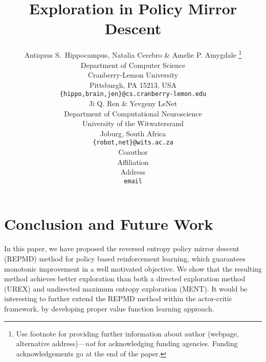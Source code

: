 \documentclass{article} %
\title{Exploration in Policy Mirror Descent}
\author{Antiquus S.~Hippocampus, Natalia Cerebro \& Amelie P. Amygdale \thanks{ Use footnote for providing further information
about author (webpage, alternative address)---\emph{not} for acknowledging
funding agencies.  Funding acknowledgements go at the end of the paper.} \\
Department of Computer Science\\
Cranberry-Lemon University\\
Pittsburgh, PA 15213, USA \\
\texttt{\{hippo,brain,jen\}@cs.cranberry-lemon.edu} \\
\And
Ji Q. Ren \& Yevgeny LeNet \\
Department of Computational Neuroscience \\
University of the Witwatersrand \\
Joburg, South Africa \\
\texttt{\{robot,net\}@wits.ac.za} \\
\AND
Coauthor \\
Affiliation \\
Address \\
\texttt{email}
}
\begin{document}
\maketitle

\begin{abstract}

\end{abstract}



%










\section{Conclusion and Future Work}
\label{sec:conclusion_and_future_work}
In this paper, we have proposed the reversed entropy policy mirror descent (REPMD) method for policy based reinforcement learning, which guarantees monotonic improvement in a well motivated objective. We show that the resulting method achieves better exploration than both a directed exploration method (UREX) and undirected maximum entropy exploration (MENT). It would be interesting to further extend the REPMD method within the actor-critic framework, by developing proper value function learning approach. %







\newpage
\appendix 

\end{document}
